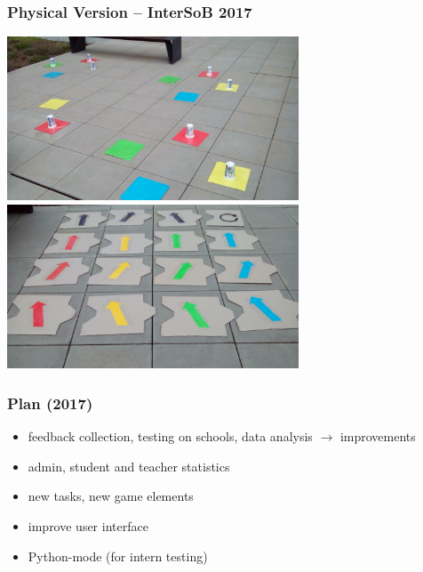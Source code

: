 \documentclass[xcolor=dvipsnames, 14pt]{beamer}
\newcommand{\imageW}[1]{%
  \makebox[\textwidth][c]{\texttt{[image: img/\#1]}}}
\begin{document}
\begin{frame}
\frametitle{Physical Version -- InterSoB 2017}
\centering
\includegraphics[width=0.65\textwidth]{img/intersob-map.jpg}\\
\includegraphics[width=0.65\textwidth]{img/intersob-blocks.jpg}
\end{frame}


\begin{frame}
\frametitle{Plan (2017)}
\begin{itemize}
\item feedback collection, testing on schools, data analysis $\rightarrow$ improvements
\item admin, student and teacher statistics
\item new tasks, new game elements  %
\item improve user interface %
\item Python-mode (for intern testing)
\end{itemize}
\end{frame}
\end{document}
